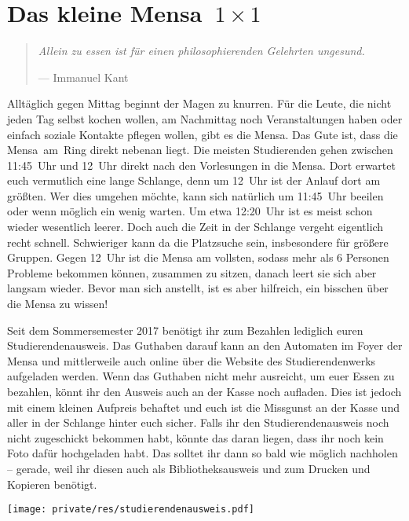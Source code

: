\section[Das kleine Mensa~1~×~1]{\boldmath Das kleine Mensa~${1 \times 1}$}
\begin{multicols}{2}
\begin{quote}
	\textit{Allein zu essen ist für einen philosophierenden Gelehrten ungesund.}
	
	\hfill--- Immanuel Kant
\end{quote}

Alltäglich gegen Mittag beginnt der Magen zu knurren.
Für die Leute, die nicht jeden Tag selbst kochen wollen, am Nachmittag noch Veranstaltungen haben oder einfach soziale Kontakte pflegen wollen, gibt es die Mensa.
Das Gute ist, dass die Mensa~am~Ring direkt nebenan liegt.
Die meisten Studierenden gehen zwischen 11:45~Uhr und 12~Uhr direkt nach den Vorlesungen in die Mensa.
Dort erwartet euch vermutlich eine lange Schlange, denn um 12~Uhr ist der Anlauf dort am größten. Wer dies umgehen möchte, kann sich natürlich um 11:45~Uhr beeilen oder wenn möglich ein wenig warten. Um etwa 12:20~Uhr ist es meist schon wieder wesentlich leerer.
Doch auch die Zeit in der Schlange vergeht eigentlich recht schnell. Schwieriger kann da die Platzsuche sein, insbesondere für größere Gruppen. Gegen 12~Uhr ist die Mensa am vollsten, sodass mehr als 6 Personen Probleme bekommen können, zusammen zu sitzen, danach leert sie sich aber langsam wieder. 
Bevor man sich anstellt, ist es aber hilfreich, ein bisschen über die Mensa zu wissen!

Seit dem Sommersemester 2017 benötigt ihr zum Bezahlen lediglich euren Studierendenausweis.
Das Guthaben darauf kann an den Automaten im Foyer der Mensa und mittlerweile auch online über die Website des Studierendenwerks aufgeladen werden.
Wenn das Guthaben nicht mehr ausreicht, um euer Essen zu bezahlen, könnt ihr den Ausweis auch an der Kasse noch aufladen. 
Dies ist jedoch mit einem kleinen Aufpreis behaftet und euch ist die Missgunst an der Kasse und aller in der Schlange hinter euch sicher.
Falls ihr den Studierendenausweis noch nicht zugeschickt bekommen habt, könnte das daran liegen, dass ihr noch kein Foto dafür hochgeladen habt.
Das solltet ihr dann so bald wie möglich nachholen -- gerade, weil ihr diesen auch als Bibliotheksausweis und zum Drucken und Kopieren benötigt.

 \begin{center}
 	\texttt{[image: private/res/studierendenausweis.pdf]}
 \end{center}


\end{multicols}
